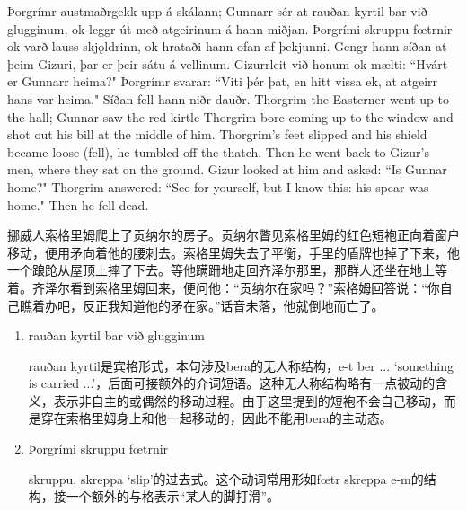 \begin{paracol}{2}
  Þorgrímr austmaðr\footnotemark gekk upp á skálann; Gunnarr sér at rauðan kyrtil bar við glugginum, ok leggr út með atgeirinum á hann miðjan. 
  Þorgrími skruppu fœtrnir ok varð lauss skjǫldrinn, ok hrataði hann ofan af þekjunni. Gengr hann síðan at þeim Gizuri, þar er þeir sátu á vellinum. Gizurr\footnotemark leit við honum ok mælti: ``Hvárt er Gunnarr heima?" Þorgrímr svarar: ``Viti þér þat, en hitt vissa ek, at atgeirr hans var heima." Síðan fell hann niðr dauðr.
  \switchcolumn
  Thorgrim the Easterner went up to the hall; Gunnar saw the red kirtle Thorgrim bore coming up to the window and shot out his bill at the middle of him. Thorgrim's feet slipped and his shield became loose (fell), he tumbled off the thatch. Then he went back to Gizur's men, where they sat on the ground. Gizur looked at him and asked: ``Is Gunnar home?" Thorgrim answered: ``See for yourself, but I know this: his spear was home." Then he fell dead.
\end{paracol}
\begin{translation*}{}
  挪威人索格里姆爬上了贡纳尔的房子。贡纳尔瞥见索格里姆的红色短袍正向着窗户移动，便用矛向着他的腰刺去。索格里姆失去了平衡，手里的盾牌也掉了下来，他一个踉跄从屋顶上摔了下去。等他蹒跚地走回齐泽尔那里，那群人还坐在地上等着。齐泽尔看到索格里姆回来，便问他：“贡纳尔在家吗？”索格姆回答说：“你自己瞧着办吧，反正我知道他的矛在家。”话音未落，他就倒地而亡了。
\end{translation*}
\begin{grammar*}{}
  \begin{enumerate}[leftmargin=*]
    \item rauðan kyrtil bar við glugginum

          rauðan kyrtil是宾格形式，本句涉及bera的无人称结构，e-t ber ... `something is carried ...'，后面可接额外的介词短语。这种无人称结构略有一点被动的含义，表示非自主的或偶然的移动过程。由于这里提到的短袍不会自己移动，而是穿在索格里姆身上和他一起移动的，因此不能用bera的主动态。

    \item Þorgrími skruppu fœtrnir

          skruppu, skreppa `slip'的过去式。这个动词常用形如fœtr skreppa e-m的结构，接一个额外的与格表示“某人的脚打滑”。
  \end{enumerate}
\end{grammar*}

